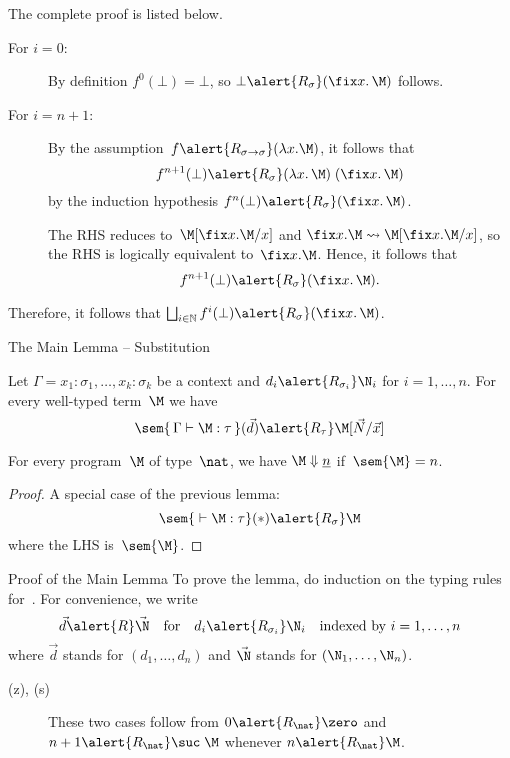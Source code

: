 \begin{frame}
  The complete proof is listed below.
  \begin{description}
    \item[For $i = 0$:] By definition $f^0(\bot) = \bot$, so
      $\bot \alert{\mathrel{R_\sigma}} (\fix x.\, \M)$ follows.
    \item[For $i = n + 1$:]
      By the assumption~$f\alert{\mathrel{R_{\sigma\to\sigma}}}(\lambda x.\M)$, it
      follows that
      \[
        f^{n+1}(\bot)
        \alert{\mathrel{R_\sigma}} (\lambda x.\,\M)\; (\fix x.\,\M)
      \]
      by the induction hypothesis
      $f^n(\bot) \alert{\mathrel{R_\sigma}} (\fix x.\, \M)$. 

      The RHS reduces to~$\M[\fix x.\M /x]$ and $\fix x.\M \leadsto
      \M[\fix x.\M / x]$, so the RHS is logically equivalent to~$\fix x.\M$.
      Hence, it follows that
      \[
        f^{n+1}(\bot) \alert{\mathrel{R_\sigma}} (\fix x.\,\M).
      \]
  \end{description}
  Therefore, it follows that $\bigsqcup_{i \in \mathbb{N}} f^{i}(\bot)
  \alert{\mathrel{R_\sigma}} (\fix x.\, \M)$. 
\end{frame}
\begin{frame}{The Main Lemma -- Substitution}
  \begin{lemma}[Substitution]
    Let $\Gamma = x_1:\sigma_1, \dots, x_k:\sigma_k$ be a context and $d_i
    \alert{\mathrel{R_{\sigma_i}}} \N_i$ for $i = 1, \dots, n$.
    For every well-typed term~$\M$ we have
    \[
      \sem{\, \Gamma \vdash \M : \tau\,}(\vec{d})
      \alert{\mathrel{R_\tau}}
      \M[\vec{N}/\vec{x}]
    \]
  \end{lemma}
  \begin{theorem}[Completeness]
    For every program~$\M$ of type~$\nat$,
    we have $\M \Downarrow \underline{n}$ if~$\sem{\M} = n$. 
  \end{theorem}
  \begin{proof}
    A special case of the previous lemma:
    \[
      \sem{{}\vdash \M:\tau}(*) \alert{\mathrel{R_\sigma}} \M
    \]
    where the LHS is~$\sem{\M}$.
  \end{proof}
\end{frame}

\begin{frame}{Proof of the Main Lemma}
  To prove the lemma, do induction on the typing rules for~\PCF{}. 
  For convenience, we write
  \[
    \vec{d} \alert{\mathrel{R}} \vec{\N}
    \quad\text{for}\quad
    d_i \alert{\mathrel{R_{\sigma_i}}} \N_i
    \quad\text{indexed by~$i = 1, \dots, n$}
  \]
  where $\vec{d}$ stands for $(d_1, \dots, d_n)$
  and $\vec{\N}$ stands for $(\N_1, \dots, \N_n)$.
  \begin{description}
    \item[(z), (s)] These two cases follow from
      $0\alert{\mathrel{R}_\nat}\zero$ and $n+1 \alert{\mathrel{R_\nat}}
      \suc\;\M$ whenever $n \alert{\mathrel{R_\nat}} \M$. 
  \end{description}
\end{frame}

